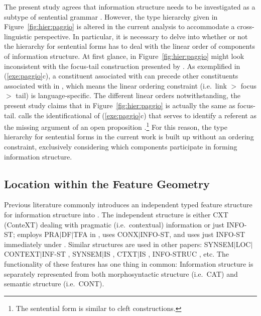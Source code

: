 The present study agrees that information structure needs to be
investigated as a subtype of sentential grammar
\citep{lambrecht:96,engdahl:vallduvi:96,paggio:09}. However, the type
hierarchy given in Figure~\ref{fig:hier:paggio} is altered in the
current analysis to accommodate a cross-linguistic perspective.  In
particular, it is necessary to delve into whether or not the hierarchy
for sentential forms has to deal with the linear order of components
of information structure.  At first glance,  in
Figure~\ref{fig:hier:paggio} might look inconsistent with the
focus-tail construction presented by
\citeauthor{engdahl:vallduvi:96}. As exemplified in
(\ref{exe:paggio}c), a constituent associated with  can
precede other constituents associated with  in
, which means the linear ordering constraint (i.e.\ link
\ensuremath{>} focus \ensuremath{>} tail) is language-specific.  The
different linear orders notwithstanding, the present study claims that
 in Figure~\ref{fig:hier:paggio} is actually the same as
focus-tail.  \citet{paggio:09} calls the identificational 
of (\ref{exe:paggio}c)  that serves to identify a
referent as the missing argument of an open proposition
\citep[p.\ 122]{lambrecht:96}.\footnote{The  sentential
  form is similar to cleft constructions.} For this
reason, the type hierarchy for sentential forms in the current work is
built up without an ordering constraint, exclusively considering which
components participate in forming information structure.






\subsection{Location within the Feature Geometry}
\label{8:ssec:hpsg:context}

Previous literature commonly introduces an independent typed feature
structure for information structure into . The independent
structure is either CXT (ConteXT) dealing with pragmatic
(i.e.\ contextual) information or just INFO-ST; \citet{chang:02}
employs PRA{$\mid$}DF{$\mid$}TFA in ,
\citet{ohtani:matsumoto:04} uses CONX{$\mid$}INFO-ST, and
\citet{kim:07} uses just INFO-ST immediately under . Similar
structures are used in other papers:
SYNSEM{$\mid$}LOC{$\mid$}CONTEXT{$\mid$}INF-ST
\citep{yoshimoto:etal:06}, SYNSEM{$\mid$}IS \citep{bildhauer:cook:10},
CTXT{$\mid$}IS \citep{bjerre:11}, INFO-STRUC
\citep{dekuthy:meurers:11}, etc.  The functionality of these features
has one thing in common: Information structure is separately
represented from both morphosyntactic structure (i.e.\ CAT) and
semantic structure (i.e.\ CONT).




